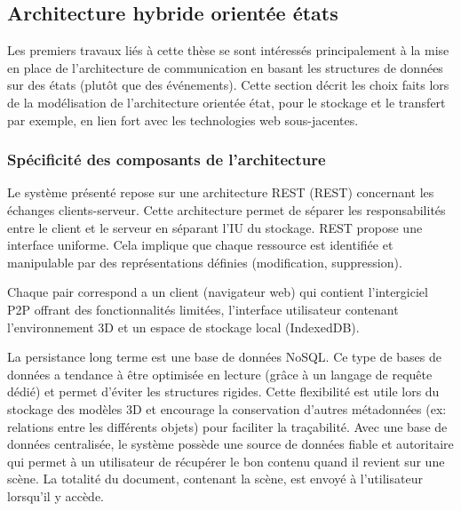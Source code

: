 \subsection{Architecture hybride \og orientée états\fg{}}
\label{sec:comm_state}

Les premiers travaux liés à cette thèse \cite{Desprat2015a,Desprat2015b} se sont 
intéressés principalement à la mise en place de l'architecture de communication 
en basant les structures de données sur des états (plutôt que des événements). 
Cette section décrit les choix faits lors de la modélisation de l'architecture \og 
orientée état\fg{}, pour le stockage et le transfert par exemple, en lien fort avec les 
technologies web sous-jacentes. 

%  
\subsubsection{Spécificité des composants de l'architecture}
Le système présenté repose sur une architecture \acrshort{REST} 
(\acrlong{REST}) concernant les échanges clients-serveur. Cette architecture 
permet de séparer les responsabilités entre le client et le serveur en séparant 
l'\gls{IU} du stockage. \gls{REST} propose une interface uniforme. Cela implique 
que chaque ressource est identifiée et manipulable par des représentations définies 
(modification, suppression). 

Chaque pair correspond a un client (navigateur web) qui contient l'intergiciel 
\gls{P2P} offrant des fonctionnalités limitées, l'interface utilisateur contenant 
l'environnement \gls{3D} et un espace de stockage local (IndexedDB).

La persistance long terme est une base de données NoSQL. Ce type de bases de 
données a tendance à être optimisée en lecture (grâce à un 
langage de requête dédié) et permet d'éviter les 
structures rigides. Cette flexibilité est utile lors du stockage des modèles \gls{3D} 
et 
encourage la conservation d'autres métadonnées (ex: relations entre les différents 
objets) pour faciliter la traçabilité. 
Avec une base de données centralisée, le système possède une source de 
données fiable et autoritaire qui permet à un utilisateur de récupérer le bon contenu 
quand il revient sur une scène. La totalité du document, contenant la scène, est 
envoyé à l'utilisateur lorsqu'il y accède.


